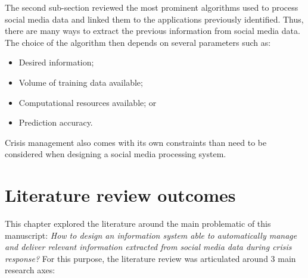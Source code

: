 The second sub-section reviewed the most prominent algorithms used to process social media data and linked them to the applications previously identified.
Thus, there are many ways to extract the previous information from social media data.
The choice of the algorithm then depends on several parameters such as:

\begin{itemize}
    \item Desired information;
    \item Volume of training data available;
    \item Computational resources available; or
    \item Prediction accuracy.
\end{itemize}

Crisis management also comes with its own constraints than need to be considered when designing a social media processing system.

\section{Literature review outcomes}
This chapter explored the literature around the main problematic of this manuscript:
\emph{How to design an information system able to automatically manage and deliver relevant information extracted from social media data during crisis response?}
For this purpose, the literature review was articulated around 3 main research axes:

